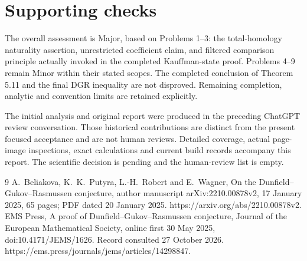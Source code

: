 \documentclass[10pt]{article}
\begin{document}
\section*{Supporting checks}
The overall assessment is Major, based on Problems 1–3: the total-homology naturality assertion, unrestricted coefficient claim, and filtered comparison principle actually invoked in the completed Kauffman-state proof. Problems 4–9 remain Minor within their stated scopes. The completed conclusion of Theorem 5.11 and the final DGR inequality are not disproved. Remaining completion, analytic and convention limits are retained explicitly.\par
The initial analysis and original report were produced in the preceding ChatGPT review conversation. Those historical contributions are distinct from the present focused acceptance and are not human reviews. Detailed coverage, actual page-image inspections, exact calculations and current build records accompany this report. The scientific decision is pending and the human-review list is empty.\par
9 A. Beliakova, K. K. Putyra, L.-H. Robert and E. Wagner, On the Dunfield–Gukov–Rasmussen conjecture, author manuscript arXiv:2210.00878v2, 17 January 2025, 65 pages; PDF dated 20 January 2025. https://arxiv.org/abs/2210.00878v2. EMS Press, A proof of Dunfield–Gukov–Rasmussen conjecture, Journal of the European Mathematical Society, online first 30 May 2025, doi:10.4171/JEMS/1626. Record consulted 27 October 2026. https://ems.press/journals/jems/articles/14298847.\par
\end{document}
